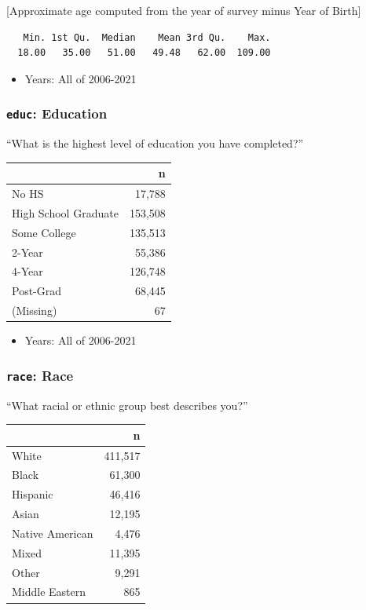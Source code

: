 \documentclass[10pt,article,oneside]{memoir}
\theoremstyle{definition}
\begin{document}
{[}Approximate age computed from the year of survey minus Year of
Birth{]}

\begin{verbatim}
   Min. 1st Qu.  Median    Mean 3rd Qu.    Max. 
  18.00   35.00   51.00   49.48   62.00  109.00 
\end{verbatim}

\begin{itemize}
\tightlist
\item
  Years: All of 2006-2021
\end{itemize}

\hypertarget{educ-education}{%
\subsubsection{\texorpdfstring{\texttt{educ}:
Education}{educ: Education}}\label{educ-education}}

``What is the highest level of education you have completed?''

\begin{table}[H]
\centering
\begin{tabular}[t]{lr}
\toprule
 & n\\
\midrule
No HS & 17,788\\
High School Graduate & 153,508\\
Some College & 135,513\\
2-Year & 55,386\\
4-Year & 126,748\\
Post-Grad & 68,445\\
(Missing) & 67\\
\bottomrule
\end{tabular}
\end{table}

\begin{itemize}
\tightlist
\item
  Years: All of 2006-2021
\end{itemize}

\hypertarget{race-race}{%
\subsubsection{\texorpdfstring{\texttt{race}:
Race}{race: Race}}\label{race-race}}

``What racial or ethnic group best describes you?''

\begin{table}[H]
\centering
\begin{tabular}[t]{lr}
\toprule
 & n\\
\midrule
White & 411,517\\
Black & 61,300\\
Hispanic & 46,416\\
Asian & 12,195\\
Native American & 4,476\\
Mixed & 11,395\\
Other & 9,291\\
Middle Eastern & 865\\
\bottomrule
\end{tabular}
\end{table}
\end{document}
